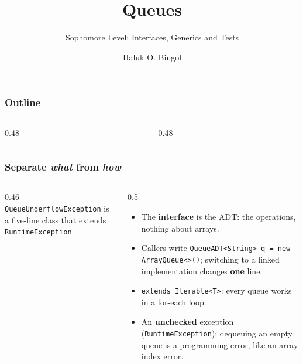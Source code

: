 \documentclass[aspectratio=169,10pt,compress]{beamer}
\title{Queues}
\subtitle{Sophomore Level: Interfaces, Generics and Tests}
\author[Bingol]{Haluk O. Bingol}
\institute[FCIS]{
    Faculty of Computer and Information Sciences\\
    Yeditepe University
}
\date{
	{\tiny \hbTimeStamp}
}
\begin{document}
\begin{frame}[t,fragile]
  \titlepage
\end{frame}




\begin{frame}[t,fragile] \frametitle{Outline}
  \begin{columns}[T]
    \begin{column}{0.48\textwidth}
      \tableofcontents[sections={1-3}, hideallsubsections]
    \end{column}
    \begin{column}{0.48\textwidth}
      \tableofcontents[sections={4-5}, hideallsubsections]
    \end{column}
  \end{columns}
\end{frame}





\begin{frame}[t,fragile] \frametitle{Separate \emph{what} from \emph{how}}
  \begin{columns}[T]
    \begin{column}{0.46\textwidth}
      \vspace{0.2em}
      \scriptsize \texttt{QueueUnderflowException} is a five-line class that extends \texttt{RuntimeException}.
    \end{column}
    \begin{column}{0.5\textwidth}
      \begin{itemize}\small
        \item The \textbf{interface} is the ADT: the operations, nothing about arrays.
        \item Callers write \texttt{QueueADT<String> q = new ArrayQueue<>()}; switching to a linked implementation changes \textbf{one} line.
        \item \texttt{extends Iterable<T>}: every queue works in a for-each loop.
        \item An \textbf{unchecked} exception (\texttt{RuntimeException}): dequeuing an empty queue is a programming error, like an array index error.
      \end{itemize}
    \end{column}
  \end{columns}
\end{frame}
\end{document}
